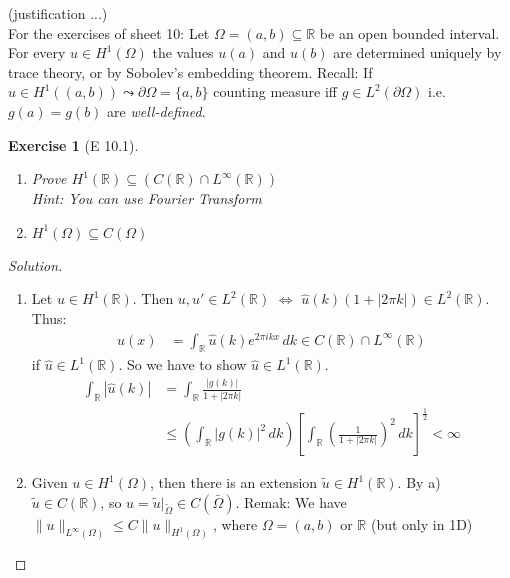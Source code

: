 \documentclass{report}
\theoremstyle{tommy}
\newtheorem{ex}[defn]{Exercise}
\begin{document}
  (justification ...) \\
  
  For the exercises of sheet 10: Let \(\Omega = (a,b) \subseteq \mathbb{R}\) be an open bounded interval. For every \(u \in H^1(\Omega)\) the values \(u(a)\) and \(u(b)\) are determined uniquely by trace theory, or by Sobolev's embedding theorem.
  Recall:
  If \(u \in H^1((a,b)) \leadsto \partial \Omega = \{a,b\}\) counting measure iff \(g \in L^2(\partial \Omega)\) i.e. \(g(a) = g(b)\) are \emph{well-defined}.
  
  \begin{ex}[E 10.1]
    \begin{enumerate}[label=\alph*)]
      \item Prove \(H^1(\mathbb{R}) \subseteq (C(\mathbb{R}) \cap L^\infty(\mathbb{R}))\) \\ Hint: You can use Fourier Transform
      \item \(H^1(\Omega) \subseteq C(\Omega)\)
    \end{enumerate}
  \end{ex}

  \begin{proof}[Solution]
    \begin{enumerate}[label=\alph*)]
      \item Let \(u \in H^1(\mathbb{R})\). Then \(u, u' \in L^2(\mathbb{R})\) \(\Leftrightarrow\) \(\hat u(k) (1 + |2 \pi k|) \in L^2(\mathbb{R})\). Thus:
      \begin{align*}
        u(x) 
        &= \int_{\mathbb{R}} \hat u(k) e^{2\pi ik x} \, dk \in C(\mathbb{R}) \cap L^\infty(\mathbb{R})
      \end{align*}
      if \(\hat u \in L^1(\mathbb{R})\). So we have to show \(\hat u \in L^1(\mathbb{R})\).
      \begin{align*}
        \int_{\mathbb{R}} |\hat u(k)|
        &= \int_{\mathbb{R}} \frac{|g(k)|}{1 + |2 \pi k|} \\
        &\le \left(\int_{\mathbb{R}}|g(k)|^2 \, dk\right) \left[\int_{\mathbb{R}} \left(\frac{1}{1 + |2 \pi k|}\right)^2 \, dk\right]^{\frac{1}{2}} < \infty
      \end{align*}
      \item Given \(u \in H^1(\Omega)\), then there is an extension \(\tilde u \in H^1(\mathbb{R})\). By a) \(\tilde u \in C(\mathbb{R})\), so \(u = \tilde u|_{\tilde \Omega} \in C(\bar \Omega)\).
      Remak: We have \(\|u\|_{L^\infty(\Omega)} \le C \|u\|_{H^1(\Omega)}\), where \(\Omega = (a,b)\) or \(\mathbb{R}\) (but only in 1D) \qedhere
    \end{enumerate}
  \end{proof}
\end{document}
